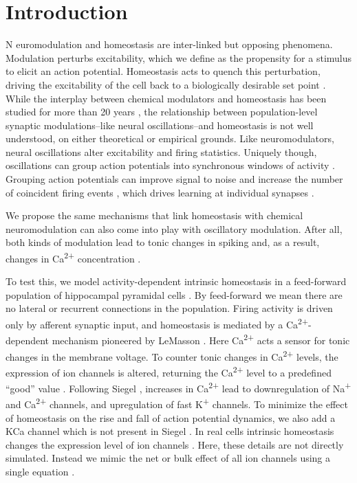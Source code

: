 \documentclass{article}
\begin{document}
\section*{Introduction}
\lettrine[loversize=0,nindent=0,realheight=true]{N}{} euromodulation and homeostasis are inter-linked but opposing phenomena. Modulation perturbs excitability, which we define as the propensity for a stimulus to elicit an action potential. Homeostasis acts to quench this perturbation, driving the excitability of the cell back to a biologically desirable set point \cite{LeMasson1993,Abbott1993}. While the interplay between chemical modulators and homeostasis has been studied for more than 20 years \cite{LeMasson1993,Abbott1993,Golowasch1999,Marder2014,Marder2015,Gutierrez2013}, the relationship between population-level synaptic modulations--like neural oscillations--and homeostasis is not well understood, on either theoretical or empirical grounds. Like neuromodulators, neural oscillations alter excitability and firing statistics. Uniquely though, oscillations can group action potentials into synchronous windows of activity \cite{Lisman2013,Voytek2015}. Grouping action potentials can improve signal to noise and increase the number of coincident firing events \cite{Chen2013,Zhou2015,Voytek2015a,Peterson2017}, which drives learning at individual synapses \cite{Muller2011,Song2000,Markram1997}. 

We propose the same mechanisms that link homeostasis with chemical neuromodulation can also come into play with oscillatory modulation. After all, both kinds of modulation lead to tonic changes in spiking and, as a result, changes in Ca\textsuperscript{2+} concentration \cite{Liu1998}. 

To test this, we model activity-dependent intrinsic homeostasis in a feed-forward population of hippocampal pyramidal cells \cite{Siegel1994}. By feed-forward we mean there are no lateral or recurrent connections in the population. Firing activity is driven only by afferent synaptic input, and homeostasis is mediated by a Ca\textsuperscript{2+}-dependent mechanism \cite{Golowasch1999,Marder2014,Marder2015,Gutierrez2013,OLeary2014} pioneered by LeMasson \cite{LeMasson1993,Abbott1993}. Here Ca\textsuperscript{2+} acts a sensor for tonic changes in the membrane voltage. To counter tonic changes in Ca\textsuperscript{2+} levels, the expression of ion channels is altered, returning the Ca\textsuperscript{2+} level to a predefined ``good'' value \cite{Golowasch1999,OLeary2013}. Following Siegel \cite{Siegel1994}, increases in Ca\textsuperscript{2+} lead to downregulation of Na\textsuperscript{+} and Ca\textsuperscript{2+} channels, and upregulation of fast K\textsuperscript{+} channels. To minimize the effect of homeostasis on the rise and fall of action potential dynamics, we also add a KCa channel which is not present in Siegel \citep{Siegel1994}. In real cells intrinsic homeostasis changes the expression level of ion channels \cite{OLeary2013}. Here, these details are not directly simulated. Instead we mimic the net or bulk effect of all ion channels using a single equation \cite{LeMasson1993,OLeary2013,OLeary2014}.
\end{document}
